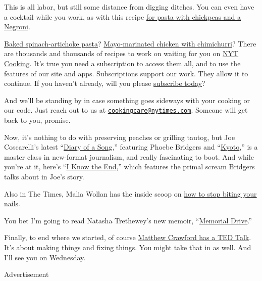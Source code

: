 This is all labor, but still some distance from digging ditches. You can
even have a cocktail while you work, as with this recipe
\href{https://cooking.nytimes.com/recipes/1020019-pasta-with-chickpeas-and-a-negroni}{for
pasta with chickpeas and a Negroni}.

\href{https://cooking.nytimes.com/recipes/1020080-baked-spinach-artichoke-pasta}{Baked
spinach-artichoke pasta}?
\href{https://cooking.nytimes.com/recipes/1020543-mayo-marinated-chicken-with-chimichurri}{Mayo-marinated
chicken with chimichurri}? There are thousands and thousands of recipes
to work on waiting for you on \href{https://cooking.nytimes.com/}{NYT
Cooking}. It's true you need a subscription to access them all, and to
use the features of our site and apps. Subscriptions support our work.
They allow it to continue. If you haven't already, will you please
\href{https://www.nytimes.com/subscription/cooking.html?campaignId=6XQHR}{subscribe
today}?

And we'll be standing by in case something goes sideways with your
cooking or our code. Just reach out to us at
\href{mailto:cookingcare@nytimes.com}{\nolinkurl{cookingcare@nytimes.com}}.
Someone will get back to you, promise.

Now, it's nothing to do with preserving peaches or grilling tautog, but
Joe Coscarelli's latest
``\href{https://www.nytimes.com/2020/07/30/arts/music/phoebe-bridgers-kyoto.html}{Diary
of a Song},'' featuring Phoebe Bridgers and
``\href{https://www.youtube.com/watch?v=Tw0zYd0eIlk}{Kyoto},'' is a
master class in new-format journalism, and really fascinating to boot.
And while you're at it, here's
``\href{https://www.youtube.com/watch?v=WJ9-xN6dCW4}{I Know the End},''
which features the primal scream Bridgers talks about in Joe's story.

Also in The Times, Malia Wollan has the inside scoop on
\href{https://www.nytimes.com/2020/07/28/magazine/how-to-stop-biting-your-nails.html}{how
to stop biting your nails}.

You bet I'm going to read Natasha Trethewey's new memoir,
``\href{https://www.nytimes.com/2020/07/27/books/review-memorial-drive-memoir-natasha-trethewey.html}{Memorial
Drive}.''

Finally, to end where we started, of course
\href{https://www.youtube.com/watch?v=xdGky1JZovg}{Matthew Crawford has
a TED Talk}. It's about making things and fixing things. You might take
that in as well. And I'll see you on Wednesday.

Advertisement

